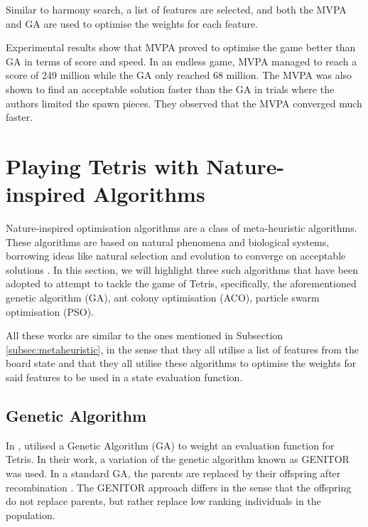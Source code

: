 \documentclass[a4paper, 12pt]{extreport}
\begin{document}
					Similar to harmony search, a list of features are selected, and both the MVPA and GA are used to optimise the weights for each feature.
					
					Experimental results show that MVPA proved to optimise the game better than GA in terms of score and speed. In an endless game, MVPA managed to reach a score of 249 million while the GA only reached 68 million. The MVPA was also shown to find an acceptable solution faster than the GA in trials where the authors limited the spawn pieces. They observed that the MVPA converged much faster.
						
		\section{Playing Tetris with Nature-inspired Algorithms}
		
			Nature-inspired optimisation algorithms are a class of meta-heuristic algorithms. These algorithms are based on natural phenomena and biological systems, borrowing ideas like natural selection and evolution to converge on acceptable solutions \cite{nia-soft-computing}. In this section, we will highlight three such algorithms that have been adopted to attempt to tackle the game of Tetris, specifically, the aforementioned genetic algorithm (GA), ant colony optimisation (ACO), particle swarm optimisation (PSO).
			
			All these works are similar to the ones mentioned in Subsection \ref{subsec:metaheuristic}, in the sense that they all utilise a list of features from the board state and that they all utilise these algorithms to optimise the weights for said features to be used in a state evaluation function.
		
			\subsection{Genetic Algorithm}
			
				In \citeyear{tetris-ga-flom-robinson}, \citeauthor{tetris-ga-flom-robinson} \cite{tetris-ga-flom-robinson} utilised a Genetic Algorithm (GA) to weight an evaluation function for Tetris. In their work, a variation of the genetic algorithm known as GENITOR was used. In a standard GA, the parents are replaced by their offspring after recombination \cite{genitor}. The GENITOR approach differs in the sense that the offspring do not replace parents, but rather replace low ranking individuals in the population.
				
\end{document}
